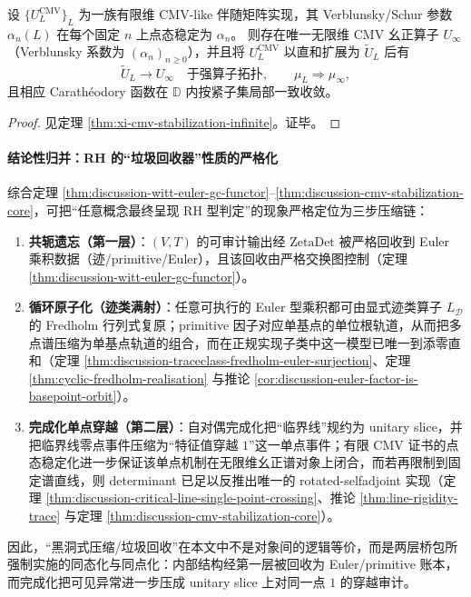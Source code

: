 \begin{theorem}[有限 CMV 证书的点态稳定化 \texorpdfstring{$\Rightarrow$}{=>} 无限维 CMV 幺正谱实现]\label{thm:discussion-cmv-stabilization-core}
设 \(\{U_L^{\mathrm{CMV}}\}_L\) 为一族有限维 CMV-like 伴随矩阵实现，其 Verblunsky/Schur 参数 \(\alpha_n(L)\) 在每个固定 \(n\) 上点态稳定为 \(\alpha_n\)。
则存在唯一无限维 CMV 幺正算子 \(U_\infty\)（Verblunsky 系数为 \((\alpha_n)_{n\ge 0}\)），并且将 \(U_L^{\mathrm{CMV}}\) 以直和扩展为 \(\widetilde U_L\) 后有
\[
\widetilde U_L\to U_\infty\quad\text{于强算子拓扑},
\qquad
\mu_L\Rightarrow \mu_\infty,
\]
且相应 Carath\'eodory 函数在 \(\mathbb{D}\) 内按紧子集局部一致收敛。
\end{theorem}

\begin{proof}
见定理 \ref{thm:xi-cmv-stabilization-infinite}。证毕。
\end{proof}

\paragraph{结论性归并：RH 的“垃圾回收器”性质的严格化}
综合定理 \ref{thm:discussion-witt-euler-gc-functor}--\ref{thm:discussion-cmv-stabilization-core}，可把“任意概念最终呈现 RH 型判定”的现象严格定位为三步压缩链：
\begin{enumerate}
  \item \textbf{共轭遗忘（第一层）}：\((V,T)\) 的可审计输出经 \(\mathrm{ZetaDet}\) 被严格回收到 Euler 乘积数据（迹/primitive/Euler），且该回收由严格交换图控制（定理 \ref{thm:discussion-witt-euler-gc-functor}）。
  \item \textbf{循环原子化（迹类满射）}：任意可执行的 Euler 型乘积都可由显式迹类算子 \(L_{\mathcal D}\) 的 Fredholm 行列式复原；primitive 因子对应单基点的单位根轨道，从而把多点谱压缩为单基点轨道的组合，而在正规实现子类中这一模型已唯一到添零直和（定理 \ref{thm:discussion-traceclass-fredholm-euler-surjection}、定理 \ref{thm:cyclic-fredholm-realisation} 与推论 \ref{cor:discussion-euler-factor-is-basepoint-orbit}）。
  \item \textbf{完成化单点穿越（第二层）}：自对偶完成化把“临界线”规约为 unitary slice，并把临界线零点事件压缩为“特征值穿越 \(1\)”这一单点事件；有限 CMV 证书的点态稳定化进一步保证该单点机制在无限维幺正谱对象上闭合，而若再限制到固定谱直线，则 determinant 已足以反推出唯一的 rotated-selfadjoint 实现（定理 \ref{thm:discussion-critical-line-single-point-crossing}、推论 \ref{thm:line-rigidity-trace} 与定理 \ref{thm:discussion-cmv-stabilization-core}）。
\end{enumerate}
因此，“黑洞式压缩/垃圾回收”在本文中不是对象间的逻辑等价，而是两层桥包所强制实施的同态化与同点化：内部结构经第一层被回收为 Euler/primitive 账本，而完成化把可见异常进一步压成 unitary slice 上对同一点 \(1\) 的穿越审计。

\endinput
